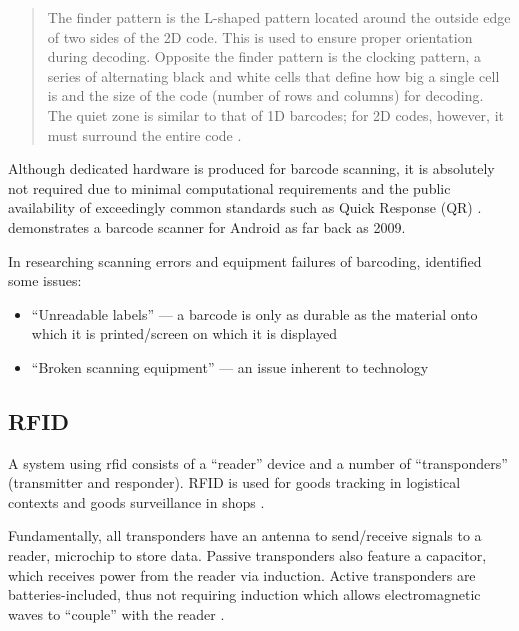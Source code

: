 \blockquote { The finder pattern is the L-shaped pattern
  located around the outside edge of two sides of the 2D
  code.
  This is used to ensure proper orientation during decoding.
  Opposite the finder pattern is the clocking pattern, a
  series of alternating black and white cells that define how
  big a single cell is and the size of the code (number of
  rows and columns) for decoding.
  The quiet zone is similar to that of 1D barcodes; for 2D
  codes, however, it must surround the entire code
  \parencite{whatIsABarcode}.
}

Although dedicated hardware is produced for barcode
scanning, it is absolutely not required due to minimal
computational requirements and the public availability of
exceedingly common standards such as Quick Response (QR)
\parencite{qrCodeStandard}.
\cite{androidBarcodeScanner} demonstrates a barcode scanner
for Android as far back as 2009.

In researching scanning errors and equipment failures of
barcoding, \cite{barcodeRfidComparison} identified some
issues: 

\begin{itemize} 

  \item \enquote{Unreadable labels} --- a barcode is
        only as durable as the material onto which it is
        printed/screen on which it is displayed 

  \item \enquote{Broken scanning equipment} --- an
        issue inherent to technology 

\end{itemize} 

\subsection{RFID} \label{ss:rfid} 

A system using \gls{rfid} consists of a \enquote{reader}
device and a number of \enquote{transponders} (transmitter
and responder).
RFID is used for goods tracking in logistical contexts and
goods surveillance in shops \parencite{whatIsRfid}.

Fundamentally, all transponders have an antenna to
send/receive signals to a reader, microchip to store data.
Passive transponders also feature a capacitor, which
receives power from the reader via induction.
Active transponders are batteries-included, thus not
requiring induction which allows electromagnetic waves to
\enquote{couple} with the reader \parencite{whatIsRfid}.

